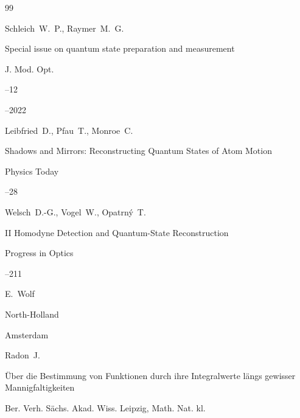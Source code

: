 \begin{thebibliography}{99}






\by  Schleich~W.~P., Raymer~M.~G.

\paper Special issue on quantum state preparation and measu\-rement

\jour J. Mod. Opt.



--12 

--2022





\by  Leibfried~D., Pfau~T., Monroe~C.

\paper Shadows and Mirrors: Reconstructing Quantum States of Atom Motion

 \jour Physics Today




--28





\by Welsch~D.-G., Vogel~W.,  Opatrn\'y~T.

\paper II Homodyne Detection and Quantum-State Reconstruction


\inbook Progress in Optics 

--211


\ed E.~Wolf

\publ North-Holland

\publaddr Amsterdam





\by  Radon~J.

\paper \"Uber die Bestimmung von Funktionen durch ihre Integralwerte l\"angs gewisser Mannigfaltigkeiten

 \jour Ber. Verh. S\"achs. Akad. Wiss. Leipzig, Math. Nat. kl.



\end{thebibliography}
